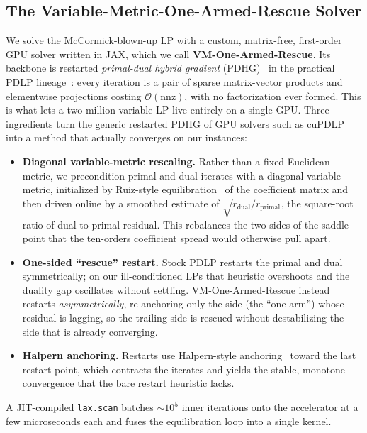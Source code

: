\subsection{The Variable-Metric-One-Armed-Rescue Solver}
\label{sec:vm_solver}

We solve the McCormick-blown-up LP with a custom, matrix-free, first-order GPU
solver written in JAX, which we call \textbf{VM-One-Armed-Rescue}. Its
backbone is restarted \emph{primal-dual hybrid gradient}
(PDHG)~\citep{chambolle2011first} in the practical PDLP
lineage~\citep{applegate2025pdlp,applegate2026pdlp}: every iteration is a pair
of sparse matrix-vector products and elementwise projections costing
$\mathcal{O}(\mathrm{nnz})$, with no factorization ever formed. This is what
lets a two-million-variable LP live entirely on a single GPU. Three
ingredients turn the generic restarted PDHG of GPU solvers such as
cuPDLP~\citep{lu2024cupdlpjlgpuimplementationrestarted,%
lu2025cupdlpxenhancedgpubasedfirstorder} into a method that actually converges
on our instances:
\begin{itemize}[leftmargin=1.5em, itemsep=1pt, topsep=2pt]
  \item \textbf{Diagonal variable-metric rescaling.} Rather than a fixed
  Euclidean metric, we precondition primal and dual iterates with a diagonal
  variable metric, initialized by Ruiz-style
  equilibration~\citep{ruiz2001scaling} of the coefficient matrix and then
  driven online by a smoothed estimate of
  $\sqrt{r_{\mathrm{dual}}/r_{\mathrm{primal}}}$, the square-root ratio of dual
  to primal residual. This rebalances the two sides of the saddle point that
  the ten-orders coefficient spread would otherwise pull apart.
  \item \textbf{One-sided ``rescue'' restart.} Stock PDLP restarts the primal
  and dual symmetrically; on our ill-conditioned LPs that heuristic overshoots
  and the duality gap oscillates without settling. VM-One-Armed-Rescue instead
  restarts \emph{asymmetrically}, re-anchoring only the side (the ``one arm'')
  whose residual is lagging, so the trailing side is rescued without
  destabilizing the side that is already converging.
  \item \textbf{Halpern anchoring.} Restarts use Halpern-style
  anchoring~\citep{halpern1967fixed} toward the last restart point, which
  contracts the iterates and yields the stable, monotone convergence that the
  bare restart heuristic lacks.
\end{itemize}
A JIT-compiled \texttt{lax.scan} batches ${\sim}10^{5}$ inner iterations onto
the accelerator at a few microseconds each and fuses the equilibration loop
into a single kernel.

